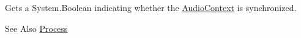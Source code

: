 Gets a System.\-Boolean indicating whether the \hyperlink{class_open_t_k_1_1_audio_1_1_audio_context}{Audio\-Context} is synchronized. 

\begin{DoxySeeAlso}{See Also}
\hyperlink{class_open_t_k_1_1_audio_1_1_audio_context_af396e510f2039ee580a0d21a20304956}{Process}


\end{DoxySeeAlso}
